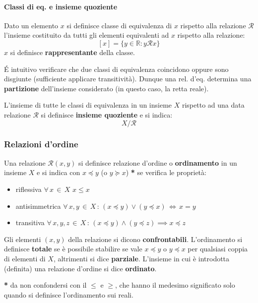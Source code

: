 \documentclass[10pt]{article}
\theoremstyle{plain}
\begin{document}
\paragraph{Classi di eq. e insieme quoziente}
\begin{defin}
    Dato un elemento $x$ si definisce classe di equivalenza di $x$ rispetto alla relazione $\mathcal{R}$ l'insieme costituito da tutti gli elementi equivalenti ad $x$ rispetto alla relazione:
    \[[x] = \{y \in \mathbb{R} : y\mathcal{R}x\}\]
    $x$ si definisce \textbf{rappresentante} della classe.
\end{defin}
\'E intuitivo verificare che due classi di equivalenza coincidono oppure sono disgiunte (sufficiente applicare transitività). Dunque una rel. d'eq. determina una \textbf{partizione} dell'insieme considerato (in questo caso, la retta reale).
\begin{defin}
    L'insieme di tutte le classi di equivalenza in un insieme $X$ rispetto ad una data relazione $\mathcal{R}$ si definisce \textbf{insieme quoziente} e si indica:
    \[X / \mathcal{R}\]
\end{defin}

\subsubsection{Relazioni d'ordine}
\begin{defin}
Una relazione $\mathcal{R}(x,y)$ si definisce relazione d'ordine o \textbf{ordinamento} in un insieme $X$ e si indica con $x \preceq y$ (o $y \succeq x$) \textbf{*} se verifica le proprietà:
\begin{itemize}
\item riflessiva $\forall \, x \, \in \, X$ $x \leq x$
\item antisimmetrica $\forall \, x, y \, \in \, X \, : \, (x \preceq y) \lor (y \preceq x) \, \Leftrightarrow \, x = y$
\item transitiva $\forall \, x,y,z \, \in \, X \, : \, (x \preceq y) \land (y \preceq z) \implies x \preceq z$ 
\end{itemize}
Gli elementi $(x,y)$ della relazione si dicono \textbf{confrontabili}. L'ordinamento si definisce \textbf{totale} se è possibile stabilire se vale $x \preceq y$ o $y \preceq x$ per qualsiasi coppia di elementi di $X$, altrimenti si dice \textbf{parziale}. L'insieme in cui è introdotta (definita) una relazione d'ordine si dice \textbf{ordinato}.
\end{defin}
\textbf{*} da non confondersi con il $\leq$ e $\geq$, che hanno il medesimo significato solo quando si definisce l'ordinamento sui reali.\\
\end{document}
